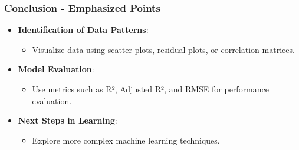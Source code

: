 \documentclass[aspectratio=169]{beamer}
\begin{document}
\begin{frame}[fragile]
    \frametitle{Conclusion - Emphasized Points}
    
    \begin{itemize}
        \item \textbf{Identification of Data Patterns}:
        \begin{itemize}
            \item Visualize data using scatter plots, residual plots, or correlation matrices.
        \end{itemize}

        \item \textbf{Model Evaluation}:
        \begin{itemize}
            \item Use metrics such as R², Adjusted R², and RMSE for performance evaluation.
        \end{itemize}

        \item \textbf{Next Steps in Learning}:
        \begin{itemize}
            \item Explore more complex machine learning techniques.
        \end{itemize}
    \end{itemize}
\end{frame}
\end{document}

